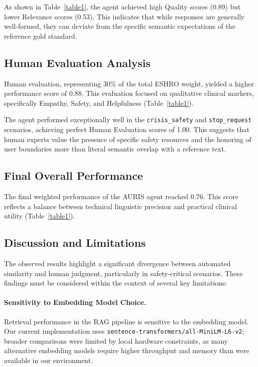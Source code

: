 \documentclass{svproc}
\begin{document}
As shown in Table~\ref{table1}, the agent achieved high Quality scores (0.89) but lower Relevance scores (0.53). This indicates that while responses are generally well-formed, they can deviate from the specific semantic expectations of the reference gold standard.

\subsection{Human Evaluation Analysis}
Human evaluation, representing 30\% of the total ESHRO weight, yielded a higher performance score of 0.88. This evaluation focused on qualitative clinical markers, specifically Empathy, Safety, and Helpfulness (Table~\ref{table1}).

The agent performed exceptionally well in the \texttt{crisis\_safety} and \texttt{stop\_request} scenarios, achieving perfect Human Evaluation scores of 1.00. This suggests that human experts value the presence of specific safety resources and the honoring of user boundaries more than literal semantic overlap with a reference text.

\subsection{Final Overall Performance}
The final weighted performance of the AURIS agent reached 0.76. This score reflects a balance between technical linguistic precision and practical clinical utility (Table~\ref{table1}).

\subsection{Discussion and Limitations}

The observed results highlight a significant divergence between automated similarity and human judgment, particularly in safety-critical scenarios. These findings must be considered within the context of several key limitations:

\paragraph{Sensitivity to Embedding Model Choice.} Retrieval performance in the RAG pipeline is sensitive to the embedding model. Our current implementation uses \texttt{sentence-transformers/all-MiniLM-L6-v2}; broader comparisons were limited by local hardware constraints, as many alternative embedding models require higher throughput and memory than were available in our environment.
\end{document}
